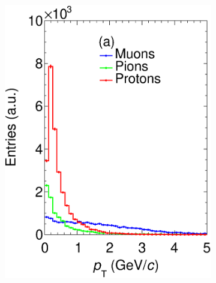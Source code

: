 \begin{figure}[t]
     \centering
     \begin{subfigure}[b]{0.32\textwidth}
         \centering
         \includegraphics[width=\textwidth]{figures/ch5-KF_NDGAr/FullSample/Int/Props/pTAllTall.eps}
         \caption{}
         \label{fig:ptTPC_Int}
     \end{subfigure}
     \begin{subfigure}[b]{0.32\textwidth}
         \centering

\end{subfigure}
\end{figure}
